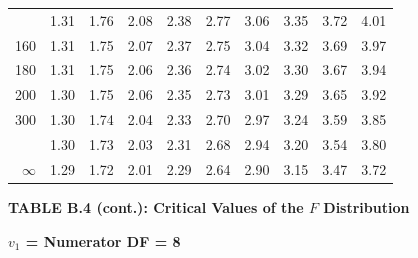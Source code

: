 \documentclass[10pt]{article}
\begin{document}
\begin{longtable}{@{}r!{\vrule width 0.8pt\hspace{0.55em}}rrrrrrrrr@{}}
 & 1.31 & 1.76 & 2.08 & 2.38 & 2.77 & 3.06 & 3.35 & 3.72 & 4.01 \\
160 & 1.31 & 1.75 & 2.07 & 2.37 & 2.75 & 3.04 & 3.32 & 3.69 & 3.97 \\
180 & 1.31 & 1.75 & 2.06 & 2.36 & 2.74 & 3.02 & 3.30 & 3.67 & 3.94 \\
200 & 1.30 & 1.75 & 2.06 & 2.35 & 2.73 & 3.01 & 3.29 & 3.65 & 3.92 \\
300 & 1.30 & 1.74 & 2.04 & 2.33 & 2.70 & 2.97 & 3.24 & 3.59 & 3.85 \\
 & 1.30 & 1.73 & 2.03 & 2.31 & 2.68 & 2.94 & 3.20 & 3.54 & 3.80 \\
$\infty$ & 1.29 & 1.72 & 2.01 & 2.29 & 2.64 & 2.90 & 3.15 & 3.47 & 3.72 \\
\end{longtable}
\newpage
\thispagestyle{empty}
\begin{center}
{\large\bfseries TABLE B.4 (cont.): Critical Values of the $F$ Distribution\par}
\end{center}
{\large\bfseries $v_1$ = Numerator DF = 8\par}
\vspace{0.5em}
\small
\end{document}
